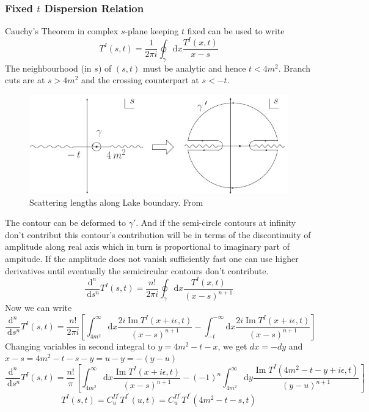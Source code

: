 ﻿\documentclass[12pt,a4paper]{article}
\begin{document}
\subsubsection{Fixed $t$ Dispersion Relation}
Cauchy's Theorem in complex $s$-plane keeping $t$ fixed can be used to write
$$T^{I}(s, t)=\frac{1}{2 \pi i} \oint_{\gamma} \mathrm{d} x \frac{T^{I}(x, t)}{x-s}$$
The neighbourhood (in $s$) of $(s,t)$ must be analytic and hence $t<4m^{2}$. Branch cuts are at $s>4m^{2}$ and the crossing counterpart at $s<-t$.
\begin{figure}[H]
  \centering
  \includegraphics[width=12cm]{9.jpg}
  \caption{Scattering lengths along Lake boundary. From \cite{2}}
  \label{fig:1}
\end{figure}
The contour can be deformed to $\gamma'$. And if the semi-circle contours at infinity don't contribut this contour's contribution will be in terms of the discontinuity of amplitude along real axis which in turn is proportional to imaginary part of ampitude. If the amplitude does not vanish sufficiently fast one can use higher derivatives until eventually the semicircular contours don't contribute.
$$
\frac{\mathrm{d}^{n}}{\mathrm{~d} s^{n}} T^{I}(s, t)=\frac{n !}{2 \pi i} \oint_{\gamma} \mathrm{d} x \frac{T^{I}(x, t)}{(x-s)^{n+1}}
$$
Now we can write 
$$
\frac{\mathrm{d}^{n}}{\mathrm{~d} s^{n}} T^{I}(s, t)=\frac{n !}{2\pi i} \left[  \int_{4 m^{2}}^{\infty} \mathrm{d} x\frac{ 2i \operatorname{Im} T^{I}(x+i \epsilon, t)}{(x-s)^{n+1}} - \int_{-t}^{-\infty} \mathrm{d} x\frac{ 2i \operatorname{Im} T^{I}(x+i \epsilon, t)}{(x-s)^{n+1}}  \right]
$$
Changing variables in second integral to $y=4m^{2}-t-x$, we get $dx=-dy$ and $x-s=4m^{2}-t-s-y=u-y=-(y-u)$
$$
\frac{\mathrm{d}^{n}}{\mathrm{~d} s^{n}} T^{I}(s, t)=\frac{n !}{\pi } \left[  \int_{4 m^{2}}^{\infty} \mathrm{d} x\frac{  \operatorname{Im} T^{I}(x+i \epsilon, t)}{(x-s)^{n+1}} -(-1)^{n} \int_{4 m^{2}}^{\infty}  \mathrm{d} y\frac{ \operatorname{Im} T^{I}(4m^{2}-t-y+i \epsilon, t)}{(y-u)^{n+1}}  \right]
$$
$$
T^{I}(s, t)=C_{u}^{I I^{\prime}} T^{I^{\prime}}(u, t)=C_{u}^{I I^{\prime}} T^{I^{\prime}}(4m^{2}-t-s, t)
$$
\end{document}

